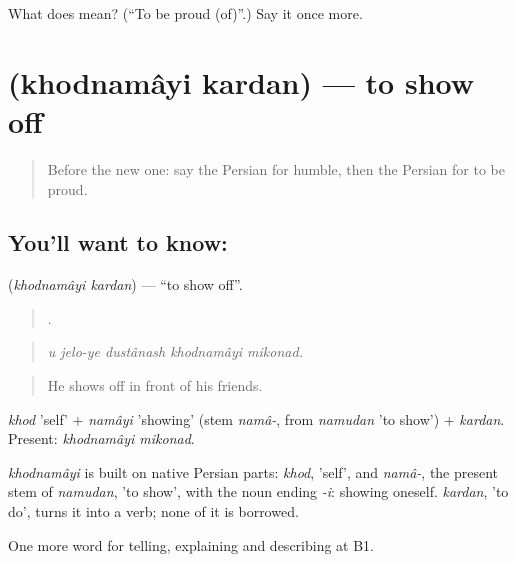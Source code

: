 \begin{tcolorbox}[breakable,colback=teal!4,colframe=teal!35!black,title={Before you move on}]
What does   mean? (\textquotedblleft{}To be proud (of)\textquotedblright{}.) Say it once more.
\end{tcolorbox}
\section[\texorpdfstring{\fa{خودنمایی} \fa{کردن} (khodnamâyi kardan)}{خودنمایی کردن (khodnamâyi kardan)}]{  (khodnamâyi kardan) — to show off}

\label{lesson:FA-C480-khodnamayi-kardan}



\begin{quote}
Before the new one: say the Persian for humble, then the Persian for to be proud.
\end{quote}

\subsection*{You'll want to know:  }
\textbf{ } (\emph{khodnamâyi kardan}) — \textquotedblleft{}to show off\textquotedblright{}.

\begin{quote}
    .
\end{quote}

\begin{quote}
\emph{u jelo-ye dustânash khodnamâyi mikonad.}
\end{quote}

\begin{quote}
He shows off in front of his friends.
\end{quote}

\emph{khod} 'self' + \emph{namâyi} 'showing' (stem \emph{namâ-}, from \emph{namudan} 'to show') + \emph{kardan}. Present: \emph{khodnamâyi mikonad}.

\begin{cousinweb}
\emph{khodnamâyi} is built on native Persian parts: \emph{khod}, 'self', and \emph{namâ-}, the present stem of \emph{namudan}, 'to show', with the noun ending \emph{-i}: showing oneself. \emph{kardan}, 'to do', turns it into a verb; none of it is borrowed.
\end{cousinweb}

\begin{grammarlens}[title={What you've built}]
One more word for telling, explaining and describing at B1.
\end{grammarlens}

